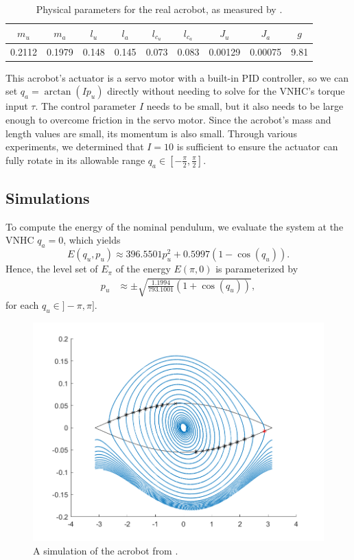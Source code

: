 \begin{table}
    \centering
    \caption{Physical parameters for the real acrobot, as measured by
    \citet{xingbo_thesis}.}
    \label{tab:acrobot-parameters}
    \begin{tabular}{ccccccccc}
        \toprule
        $m_u$ & $m_a$ & $l_u$ & $l_a$ & $l_{c_u}$ & $l_{c_a}$ & $J_u$ & $J_a$ & $g$ \\
        \midrule
        0.2112 & 0.1979 & %
        0.148 & 0.145 & %
        0.073 & 0.083 & %
        0.00129 & 0.00075 & %
        9.81 \\ %
        \bottomrule
    \end{tabular}
\end{table}

This acrobot's actuator is a servo motor with a built-in PID controller, so we
can set \(q_a = \arctan\left(I p_u\right)\) directly without needing to solve
for the VNHC's torque input \(\tau\).
The control parameter \(I\) needs to be small, but it also needs to be large
enough to overcome friction in the servo motor.
Since the acrobot's mass and length values are small, its momentum is
also small.
Through various experiments, we determined that \(I = 10\) is sufficient to
ensure the actuator can fully rotate in its allowable range
\(q_a \in \left[ -\frac{\pi}{2}, \frac{\pi}{2}\right]\).

\subsection{Simulations}

To compute the energy of the nominal pendulum, we evaluate the system at the
VNHC \(q_a = 0\), which yields
\[
    E(q_u,p_u) \approx 396.5501 p_u^2 + 0.5997(1 - \cos(q_u))
    .
\]
Hence, the level set of \(E_\pi\) of the energy \(E(\pi,0)\) is parameterized by
\begin{align*}
    p_u &\approx \pm \sqrt{\frac{1.1994}{793.1001}(1 + \cos(q_u))}
    ,
\end{align*}
for each \(q_u \in ]-\pi,\pi]\).

\begin{figure}[ht]
    \centering
    \includegraphics[width=0.8\linewidth]{images/acrobot_orbit.png}
    \caption{A simulation of the acrobot from \cite{xingbo_thesis}.}
    \label{fig:acrobot-orbit}
\end{figure}

